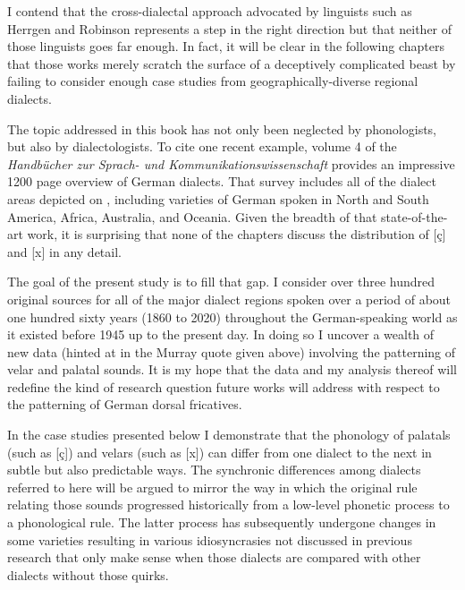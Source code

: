 I contend that the cross-dialectal approach advocated by linguists such as Herrgen and Robinson represents a step in the right direction but that neither of those linguists goes far enough. In fact, it will be clear in the following chapters that those works merely scratch the surface of a deceptively complicated beast by failing to consider enough case studies from geographically-diverse regional dialects. 

The topic addressed in this book has not only been neglected by phonologists, but also by dialectologists. To cite one recent example, volume 4 of the \textit{Handbücher zur Sprach- und Kommunikationswissenschaft} \citep{HerrgenSchmidt2019} provides an impressive 1200 page overview of German dialects. That survey includes all of the dialect areas depicted on , including varieties of German spoken in North and South America, Africa, Australia, and Oceania. Given the breadth of that state-of-the-art work, it is surprising that none of the chapters discuss the distribution of [ç] and [x] in any detail.

The goal of the present study is to fill that gap. I consider over three hundred  original sources for all of the major dialect regions spoken over a period of about one hundred sixty years (1860 to 2020) throughout the German-speaking world as it existed before 1945 up to the present day. In doing so I uncover a wealth of new data (hinted at in the Murray quote given above) involving the patterning of velar and palatal sounds. It is my hope that the data and my analysis thereof will redefine the kind of research question future works will address with respect to the patterning of German dorsal fricatives.

 In the case studies presented below I demonstrate that the phonology of palatals (such as [ç]) and velars (such as [x]) can differ from one dialect to the next in subtle but also predictable ways. The synchronic differences among dialects referred to here will be argued to mirror the way in which the original rule relating those sounds progressed historically from a low-level phonetic process to a phonological rule. The latter process has subsequently undergone changes in some varieties resulting in various idiosyncrasies not discussed in previous research that only make sense when those dialects are compared with other dialects without those quirks.  

